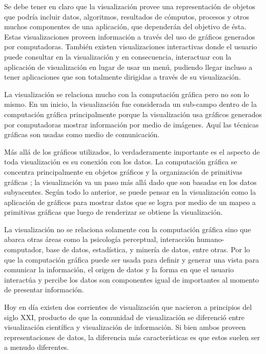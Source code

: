 \documentclass[12pt]{article}
\begin{document}
Se debe tener en claro que la visualización provee una representación de objetos que podría incluir datos, algoritmos, resultados de cómputos, procesos y otros muchos componentes de una aplicación, que dependerán del objetivo de ésta. Estas visualizaciones proveen información a través del uso de gráficos generados por computadoras. También existen visualizaciones interactivas donde el usuario puede consultar en la visualización y en consecuencia, interactuar con la aplicación de visualización en lugar de usar un menú, pudiendo llegar incluso a tener aplicaciones que son totalmente dirigidas a través de su visualización.


La visualización se relaciona mucho con la computación gráfica pero no son lo mismo. En un inicio, la visualización fue considerada un sub-campo dentro de la computación gráfica principalmente porque la visualización usa gráficos generados por computadoras mostrar información por medio de imágenes. Aquí las técnicas gráficas son usadas como medio de comunicación.

Más allá de los gráficos utilizados, lo verdaderamente importante es el aspecto de toda visualización es su conexión con los datos. La computación gráfica se concentra principalmente en objetos gráficos y la organización de primitivas gráficas ; la visualización va un paso más allá dado que son basadas en los datos subyacentes. Según todo lo anterior, se puede pensar en la visualización como la aplicación de gráficos para mostrar datos que se logra por medio de un mapeo a primitivas gráficas que luego de renderizar se obtiene la visualización.


La visualización no se relaciona solamente con la computación gráfica sino que abarca otras áreas como la psicología perceptual, interacción humano-computador, base de datos, estadística, y minería de datos, entre otras. Por lo que la computación gráfica puede ser usada para definir y generar una vista para comunicar la información, el origen de datos y la forma en que el usuario interactúa y percibe los datos son componentes igual de importantes al momento de presentar información. 
	
Hoy en día existen dos corrientes de visualización que nacieron a principios del siglo XXI, producto de que la comunidad de visualización se diferenció entre visualización científica y visualización de información. Si bien ambos proveen representaciones de datos, la diferencia más características es que estos suelen ser a menudo diferentes. 
\end{document}
